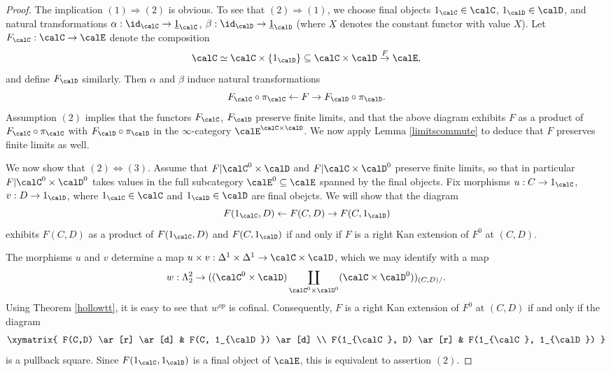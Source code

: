 \begin{proof}
The implication $(1) \Rightarrow (2)$ is obvious. To see that $(2) \Rightarrow (1)$, we
choose final objects $1_{\calC} \in \calC$, $1_{\calD} \in \calD$, and natural transformations
$\alpha: \id_{\calC} \rightarrow \underline{1}_{\calC}$, $\beta: \id_{\calD} \rightarrow \underline{1}_{\calD}$ (where $\underline{X}$ denotes the constant functor with value $X$).
Let $F_{\calC}: \calC \rightarrow \calE$ denote the composition
$$ \calC \simeq \calC \times \{1_{\calD} \} \subseteq \calC \times \calD \stackrel{F}{\rightarrow} \calE,$$ and define $F_{\calD}$ similarly. Then $\alpha$ and $\beta$ induce natural transformations
$$ F_{\calC} \circ \pi_{\calC} \leftarrow F \rightarrow F_{\calD} \circ \pi_{\calD}.$$
Assumption $(2)$ implies that the functors $F_{\calC}$, $F_{\calD}$ preserve finite limits, and that the above diagram exhibits $F$ as a product of $F_{\calC} \circ \pi_{\calC}$ with
$F_{\calD} \circ \pi_{\calD}$ in the $\infty$-category $\calE^{\calC \times \calD}$. We now apply Lemma \ref{limitscommute} to deduce that $F$ preserves finite limits as well.

We now show that $(2) \Leftrightarrow (3)$. Assume that $F| \calC^{0} \times \calD$
and $F| \calC \times \calD^{0}$ preserve finite limits, so that in particular 
$F | \calC^{0} \times \calD^{0}$ takes values in the full subcategory $\calE^0 \subseteq \calE$ spanned by the final objects. Fix morphisms $u: C \rightarrow 1_{\calC}$, $v: D \rightarrow 1_{\calD}$, where $1_{\calC} \in \calC$ and $1_{\calD} \in \calD$ are final obejcts. We will show that
the diagram $$ F(1_{\calC},D) \leftarrow F(C,D) \rightarrow F(C, 1_{\calD})$$ exhibits
$F(C,D)$ as a product of $F(1_{\calC},D)$ and $F(C,1_{\calD})$ if and only if
$F$ is a right Kan extension of $F^0$ at $(C,D)$.

The morphisms $u$ and $v$ determine a map $u \times v: \Delta^1 \times \Delta^1 \rightarrow \calC \times \calD$, which we may identify with a map
$$ w: \Lambda^2_2 \rightarrow ((\calC^{0} \times \calD) \coprod_{ \calC^0 \times \calD^0} (\calC \times \calD^{0}))_{(C,D)/}.$$
Using Theorem \ref{hollowtt}, it is easy to see that $w^{op}$ is cofinal. Consequently,
$F$ is a right Kan extension of $F^{0}$ at $(C,D)$ if and only if the diagram
$$ \xymatrix{ F(C,D) \ar[r] \ar[d] & F(C, 1_{\calD}) \ar[d] \\
F(1_{\calC}, D) \ar[r] & F(1_{\calC}, 1_{\calD}) }$$
is a pullback square. Since $F(1_{\calC}, 1_{\calD})$ is a final object of $\calE$, this is
equivalent to assertion $(2)$.
\end{proof}

